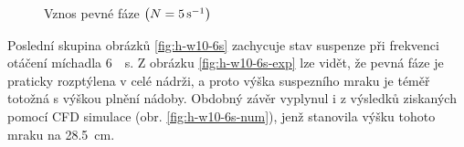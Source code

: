 \begin{figure}[t!]
 \centering
  \qquad 
  \caption{Vznos pevné fáze $\left( N=\SI{5}{\per\second} \right)$}
  \label{fig:h-w10-5s}
\end{figure}
Poslední skupina obrázků \ref{fig:h-w10-6s} zachycuje stav suspenze při frekvenci otáčení míchadla \SI{6}{\per\second}. Z obrázku \ref{fig:h-w10-6s-exp} lze vidět, že pevná fáze je praticky rozptýlena v celé nádrži, a proto výška suspezního mraku je téměř totožná s výškou plnění nádoby. Obdobný závěr vyplynul i z výsledků ziskaných pomocí CFD simulace (obr. \ref{fig:h-w10-6s-num}), jenž stanovila výšku tohoto mraku na \SI{28.5}{\centi\meter}.

